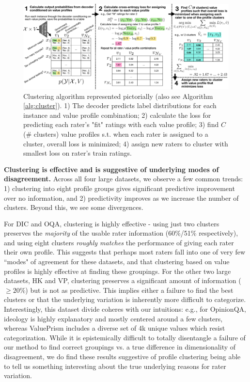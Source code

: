 \documentclass[11pt]{article}
\begin{document}
\begin{figure}[ht]
\centering
\vspace{-5pt}
\includegraphics[width=1\textwidth]{files/clusterfig.pdf}
\small
\vspace{-15pt}
\caption{Clustering algorithm represented pictorially (also see Algorithm \ref{alg:cluster}).
1) The decoder predicts label distributions for each instance and value profile combination;
2) calculate the loss for predicting each rater's "fit" ratings with each value profile;
3) find $C$ (\# clusters) value profiles s.t. when each rater is assigned to a cluster, overall loss is minimized;
4) assign new raters to cluster with smallest loss on rater's train ratings.
}
\label{fig:clusteralgo}
\end{figure}

\textbf{Clustering is effective and is suggestive of underlying modes of disagreement.}
Across all four large datasets, we observe a few common trends: 1) clustering into eight profile groups gives significant predictive improvement over no information, and 2) predictivity improves as we increase the number of clusters. Beyond this, we see some divergences.

For DIC and OQA, clustering is highly effective - using just two clusters preserves the \textit{majority} of the usable rater information (60\%/51\% respectively), and using eight clusters \textit{roughly matches} the performance of giving each rater their own profile. This suggests that perhaps most raters fall into one of very few ``modes" of agreement for these datasets, and that clustering based on value profiles is highly effective at finding these groupings.
For the other two large datasets, HK and VP, clustering preserves a significant amount of information ($\geq20\%$) but is not as predictive.
This implies either a failure to find the best clusters or that the underlying variation is inherently more difficult to categorize. Interestingly, this dataset divide coheres with our intuitions: e.g., for OpinionQA, ideology is highly explanatory and mostly centered around a few clusters, whereas ValuePrism includes a diverse set of 4k unique values which resist categorization. While it is epistemically difficult to totally disentangle a failure of our method to find correct groupings vs. a true difference in dimensionality of disagreement, we do find these results suggestive of profile clustering being able to tell us something interesting about the true underlying reasons for rater variation.
\end{document}
